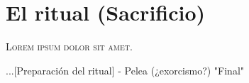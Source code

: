 

\chapter{El ritual (Sacrificio)}
\lettrine{L}{orem ipsum dolor sit amet}. 

...[Preparación del ritual]
- Pelea (¿exorcismo?) "Final"